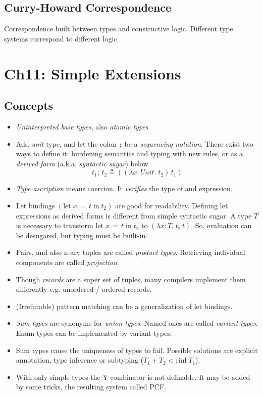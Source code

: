\documentclass{article}
\newcommand{\lett}[3]{\text{let}\; #1\, =\, #2 \;\text{in}\; #3}
\newcommand{\lamt}[3]{\lambda #1: #2 .\;#3}
\newcommand{\appp}[2]{\left(#1\, #2\right)}
\begin{document}
\subsection{Curry-Howard Correspondence}
  Correspondence built between types and constructive logic.
  Different type systems correspond to different logic.



\section{Ch11: Simple Extensions}

\subsection{Concepts}
  \begin{itemize}
    \item \emph{Uninterpreted base types}, also \emph{atomic types}.
    \item Add \emph{unit} type, and let the colon \texttt{;} be a
      \emph{sequencing notation}. There exist two ways to define it:
      burdening semantics and typing with new rules,
      or as a \emph{derived form} (a.k.a. \emph{syntactic sugar}) below
      \[ t_1;\, t_2 \triangleq \appp{(\lamt{x}{Unit}{t_2})}{t_1}\]
    \item \emph{Type ascription} means coercion.
      It \emph{verifies} the type of and expression.
    \item Let bindings $(\lett{x}{t}{t_2})$ are good for readability.
      Defining let expressions as derived forms is different from simple syntactic sugar.
      A type $T$ is necessary to transform $\lett{x}{t}{t_2}$ to $\appp{\lamt{x}{T}{t_2}}{t}$.
      So, evaluation can be desugared, but typing must be built-in.
    \item Pairs, and also n-ary tuples are called \emph{product types}.
      Retrieving individual components are called \emph{projection}.
    \item Though \emph{records} are a super set of tuples, many compilers implement them differently e.g. unordered / ordered records.
    \item (Irrefutable) pattern matching can be a generalization of let bindings.
    \item \emph{Sum types} are synonyms for \emph{union types}.
      Named ones are called \emph{variant types}.
      Enum types can be implemented by variant types.
    \item Sum types cause the uniqueness of types to fail.
      Possible solutions are explicit annotation,
      type inference or subtyping ($T_1 + T_2 <: \text{inl}\; T_1$).
    \item With only simple types the Y combinator is not definable.
      It may be added by some tricks, the resulting system called PCF.
  \end{itemize}
\end{document}
